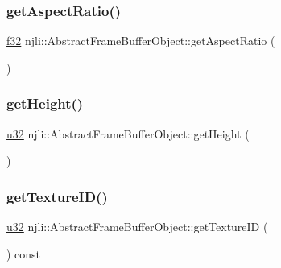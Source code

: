\subsubsection{\texorpdfstring{get\+Aspect\+Ratio()}{getAspectRatio()}}
{\footnotesize\ttfamily \mbox{\hyperlink{_util_8h_a5f6906312a689f27d70e9d086649d3fd}{f32}} njli\+::\+Abstract\+Frame\+Buffer\+Object\+::get\+Aspect\+Ratio (\begin{DoxyParamCaption}{ }\end{DoxyParamCaption})\hspace{0.3cm}{\ttfamily [protected]}}

\mbox{\label{classnjli_1_1_abstract_frame_buffer_object_a95ae9779550ed7496011f859ec3d4766}} 
\subsubsection{\texorpdfstring{get\+Height()}{getHeight()}}
{\footnotesize\ttfamily \mbox{\hyperlink{_util_8h_a10e94b422ef0c20dcdec20d31a1f5049}{u32}} njli\+::\+Abstract\+Frame\+Buffer\+Object\+::get\+Height (\begin{DoxyParamCaption}{ }\end{DoxyParamCaption})\hspace{0.3cm}{\ttfamily [protected]}}

\mbox{\label{classnjli_1_1_abstract_frame_buffer_object_ae5fdf18cef91c86d8e1cf97d4728d144}} 
\subsubsection{\texorpdfstring{get\+Texture\+I\+D()}{getTextureID()}}
{\footnotesize\ttfamily \mbox{\hyperlink{_util_8h_a10e94b422ef0c20dcdec20d31a1f5049}{u32}} njli\+::\+Abstract\+Frame\+Buffer\+Object\+::get\+Texture\+ID (\begin{DoxyParamCaption}{ }\end{DoxyParamCaption}) const\hspace{0.3cm}{\ttfamily [protected]}}

